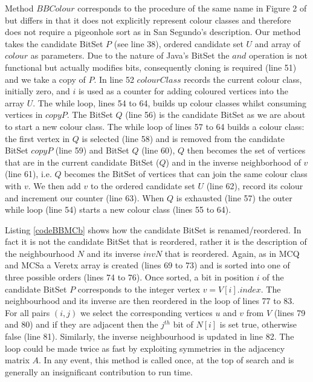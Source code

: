 \documentclass{l4proj}
\begin{document}
\begin{figure}

\end{figure}

Method $BBColour$ corresponds to the procedure of the same name in Figure 2 of \cite{segundo2011} but differs
in that it does not explicitly represent colour classes and therefore does not require a pigeonhole sort as in San Segundo's description. Our
method takes the candidate BitSet $P$ (see line 38), ordered candidate set $U$ and array of $colour$ as parameters. 
Due to the nature of Java's BitSet the $and$ operation is not functional but actually modifies bits, consequently cloning is 
required (line 51) and we take a copy of $P$. In line 52 $colourClass$
records the current colour class, initially zero, and $i$ is used as a counter for adding coloured vertices into the array $U$.
The while loop, lines 54 to 64, builds up colour classes whilst consuming vertices in $copyP$. The BitSet $Q$ (line 56) is 
the candidate BitSet as we are about to start a new colour class. The while loop of
lines 57 to 64 builds a colour class: the first vertex in $Q$ is selected (line 58) and is removed
from the candidate BitSet $copyP$ (line 59) and BitSet $Q$ (line 60), $Q$ then becomes the set of vertices that 
are in the current candidate BitSet ($Q$) and in the inverse neighborhood of $v$ (line 61), i.e. $Q$ becomes the BitSet 
of vertices that can join the same colour class with $v$. We then add $v$ to the ordered candidate set $U$ (line 62),
record its colour and increment our counter (line 63). When $Q$ is exhausted (line 57) the outer while loop (line 54) starts a 
new colour class (lines 55 to 64).

Listing \ref{codeBBMCb} shows how the candidate BitSet is renamed/reordered. In fact it is not
the candidate BitSet that is reordered, rather it is the description of the neighbourhood $N$ and its inverse $invN$ that
is reordered. Again, as in MCQ and MCSa a Veretx array is
created (lines 69 to 73) and is sorted into one of three possible orders (lines 74 to 76). Once sorted,
a bit in position $i$ of the candidate BitSet $P$ corresponds to the integer vertex $v = V[i].index$.
The neighbourhood and its inverse are then reordered in the loop of lines 77 to 83. For all pairs $(i,j)$
we select the corresponding vertices $u$ and $v$ from $V$ (lines 79 and 80) and if they are adjacent then the $j^{th}$ bit of $N[i]$ is set
true, otherwise false (line 81). Similarly, the inverse neighbourhood is updated in line 82. The loop could be made
twice as fast by exploiting symmetries in the adjacency matrix $A$.
In any event, this method is called once, at the top of search and is generally an insignificant contribution to run time.
\end{document}
